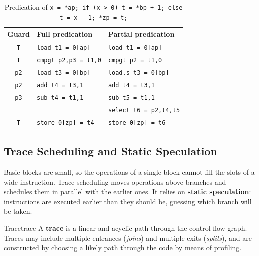 \begin{table}[htbp]
\centering
\caption{Predication of \texttt{x = *ap; if (x > 0) t = *bp + 1; else t = x - 1; *zp = t;}}
\label{tab:predication_example}
\small
\begin{tabularx}{\textwidth}{|c|l|l|}
\hline
\textbf{Guard} & \textbf{Full predication} & \textbf{Partial predication} \\ \hline
\texttt{T} & \texttt{load t1 = 0[ap]} & \texttt{load t1 = 0[ap]} \\ \hline
\texttt{T} & \texttt{cmpgt p2,p3 = t1,0} & \texttt{cmpgt p2 = t1,0} \\ \hline
\texttt{p2} & \texttt{load t3 = 0[bp]} & \texttt{load.s t3 = 0[bp]} \\ \hline
\texttt{p2} & \texttt{add t4 = t3,1} & \texttt{add t4 = t3,1} \\ \hline
\texttt{p3} & \texttt{sub t4 = t1,1} & \texttt{sub t5 = t1,1} \\ \hline
 & & \texttt{select t6 = p2,t4,t5} \\ \hline
\texttt{T} & \texttt{store 0[zp] = t4} & \texttt{store 0[zp] = t6} \\ \hline
\end{tabularx}
\end{table}

\subsection{Trace Scheduling and Static Speculation}
\label{sec:vliw_trace_scheduling}

Basic blocks are small, so the operations of a single block cannot fill the slots of a wide instruction. Trace scheduling moves operations above branches and schedules them in parallel with the earlier ones. It relies on \textbf{static speculation}: instructions are executed earlier than they should be, guessing which branch will be taken.

\begin{definition}{Trace}{trace}
    A \textbf{trace} is a linear and acyclic path through the control flow graph. Traces may include multiple entrances (\textit{joins}) and multiple exits (\textit{splits}), and are constructed by choosing a likely path through the code by means of profiling.
\end{definition}

